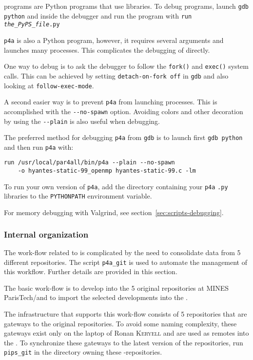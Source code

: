 \documentclass[a4paper]{article}
\begin{document}
\Apyps programs are Python programs that use
\Apips libraries. To debug \Apyps programs, launch \texttt{gdb python}
and inside the debugger and run the program with \texttt{run
\emph{the\_PyPS\_file}.py}

\texttt{p4a} is also a Python program, however, it requires several
arguments and launches many processes. This complicates the debugging
of \Apips directly.

One way to debug \Apips is to ask the debugger to follow the
\texttt{fork()} and \texttt{exec()} system calls. This can be achieved
by setting \texttt{detach-on-fork off} in
\texttt{gdb} and also looking at \texttt{follow-exec-mode}.

A second easier way is to prevent \texttt{p4a} from launching
processes. This is accomplished with the \verb/--no-spawn/
option. Avoiding colors and other
decoration by using the \verb/--plain/ is also useful when debugging.

The preferred method for debugging \texttt{p4a} from \texttt{gdb} is
to launch first
\texttt{gdb python} and then run \texttt{p4a} with:
\begin{verbatim}
run /usr/local/par4all/bin/p4a --plain --no-spawn
    -o hyantes-static-99_openmp hyantes-static-99.c -lm
\end{verbatim}

To run your own version of \texttt{p4a}, add the directory
containing your \texttt{p4a} \texttt{.py} libraries to the
\texttt{PYTHONPATH} environment variable.

For memory debugging with Valgrind, see
section~\ref{sec:scripts-debugging}.


\subsubsection{Internal organization}
\label{sec:intern-organ}

The work-flow related to \Apips is complicated by the need to
consolidate data from 5 different \Asvn repositories. The script
\verb|p4a_git| is used to automate the management of this workflow.
Further details are provided in this section.

The basic \Apips work-flow is to develop into the 5 original \Apips{}
\Asvn repositories at MINES ParisTech/\Acri and to import the selected
developments into the \Apfa{} \Agit.

The infrastructure that supports this work-flow consists of 5 \Agit
repositories that are
gateways to the original \Asvn
repositories. To avoid some naming complexity, these gateways exist only on the laptop
of Ronan \textsc{Keryell} and are used as remotes into
the \Apfa{} \Agit. To synchronize these gateways to the latest version of
the \Apips{} \Asvn repositories, run \verb|pips_git| in the directory
owning these \Agit-\Asvn repositories.
\end{document}
